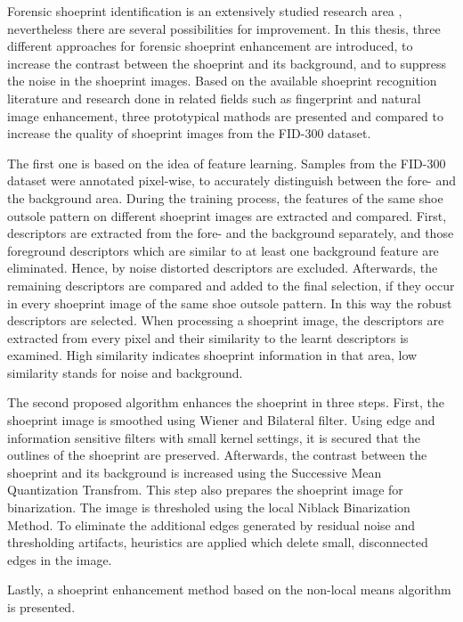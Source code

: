 \documentclass[draft,final]{vutinfth} %
\begin{document}
\par
Forensic shoeprint identification is an extensively studied research area \cite{rida2019forensic}, nevertheless there are several possibilities for improvement.
In this thesis, three different approaches for forensic shoeprint enhancement are introduced, to increase the contrast between the shoeprint and its background, and to suppress the noise in the shoeprint images.
Based on the available shoeprint recognition literature and research done in related fields such as fingerprint and natural image enhancement, three prototypical mathods are presented and compared to increase the quality of shoeprint images from the FID-300 dataset.
\par
The first one is based on the idea of feature learning.
Samples from the FID-300 dataset were annotated pixel-wise, to accurately distinguish between the fore- and the background area.
During the training process, the features of the same shoe outsole pattern on different shoeprint images are extracted and compared.
First, descriptors are extracted from the fore- and the background separately, and those foreground descriptors which are similar to at least one background feature are eliminated. 
Hence, by noise distorted descriptors are excluded.
Afterwards, the remaining descriptors are compared and added to the final selection, if they occur in every shoeprint image of the same shoe outsole pattern.
In this way the robust descriptors are selected.
When processing a shoeprint image, the descriptors are extracted from every pixel and their similarity to the learnt descriptors is examined.
High similarity indicates shoeprint information in that area, low similarity stands for noise and background.
\par
The second proposed algorithm enhances the shoeprint in three steps.
First, the shoeprint image is smoothed using Wiener and Bilateral filter.
Using edge and information sensitive filters with small kernel settings, it is secured that the outlines of the shoeprint are preserved.
Afterwards, the contrast between the shoeprint and its background is increased using the Successive Mean Quantization Transfrom.
This step also prepares the shoeprint image for binarization.
The image is thresholed using the local Niblack Binarization Method.
To eliminate the additional edges generated by residual noise and thresholding artifacts, heuristics are applied which delete small, disconnected edges in the image.
\par
Lastly, a shoeprint enhancement method based on the non-local means algorithm is presented.
\end{document}
